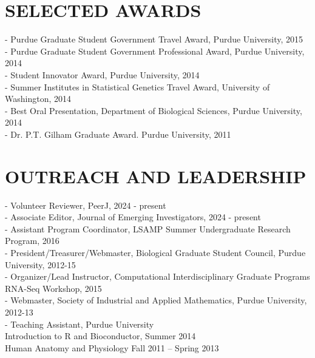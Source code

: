 \documentclass[11pt,letterpaper,sans]{moderncv}        %
\begin{document}
{{\section{SELECTED AWARDS}
\begin{minipage}{\maincolumnwidth}%
	\small{
	- Purdue Graduate Student Government Travel Award, Purdue University, 2015\\
          - Purdue Graduate Student Government Professional Award, Purdue University, 2014\\
          - Student Innovator Award, Purdue University, 2014\\
          - Summer Institutes in Statistical Genetics Travel Award, University of Washington, 2014\\
	- Best Oral Presentation, Department of Biological Sciences, Purdue University, 2014\\
	 - Dr. P.T. Gilham Graduate Award. Purdue University, 2011
	}%
\end{minipage}%
 
\section{OUTREACH AND LEADERSHIP}
\begin{minipage}{\maincolumnwidth}%
	\small{
	 - Volunteer Reviewer, PeerJ, 2024 - present\\
	 - Associate Editor, Journal of Emerging Investigators, 2024 - present\\
          - Assistant Program Coordinator, LSAMP Summer Undergraduate Research Program, 2016\\
          - President/Treasurer/Webmaster, Biological Graduate Student Council, Purdue University, 2012-15\\
          - Organizer/Lead Instructor, Computational Interdisciplinary Graduate Programs RNA-Seq Workshop, 2015\\
          - Webmaster, Society of Industrial and Applied Mathematics, Purdue University, 2012-13\\
	- Teaching Assistant, Purdue University\\
		\tab \quad  \bullet Introduction to R and Bioconductor, Summer 2014\\ 
		\tab \quad \bullet  Human Anatomy and Physiology Fall 2011 – Spring 2013
	}%
\end{minipage}%

}
\nocite{*}


}
\end{document}

